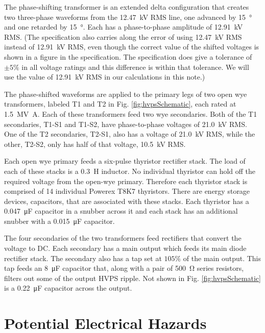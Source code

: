 \documentclass[letterpaper,11pt]{article}
\begin{document}
The phase-shifting transformer is an extended delta configuration that creates two three-phase waveforms from the \SI{12.47}{\kV} RMS line, one advanced by \SI{15}{\degree} and one retarded by \SI{15}{\degree}.  Each has a phase-to-phase amplitude of \SI{12.91}{\kV} RMS.  (The specification also carries along the error of using \SI{12.47}{\kV} RMS instead of \SI{12.91}{\kV} RMS, even though the correct value of the shifted voltages is shown in a figure in the specification.  The specification does give a tolerance of $\pm5\%$ in all voltage ratings and this difference is within that tolerance.  We will use the value of \SI{12.91}{\kV} RMS in our calculations in this note.)

The phase-shifted waveforms are applied to the primary legs of two open wye transformers, labeled T1 and T2 in Fig. \ref{fig:hvpsSchematic}, each rated at \SI{1.5}{\mega\volt\ampere}.  Each of these transformers feed two wye secondaries.  Both of the T1 secondaries, T1-S1 and T1-S2, have phase-to-phase voltages of  \SI{21.0}{\kV} RMS.  One of the T2 secondaries, T2-S1, also has a voltage of \SI{21.0}{\kV} RMS, while the other, T2-S2, only has half of that voltage, \SI{10.5}{\kV} RMS.

Each open wye primary feeds a six-pulse thyristor rectifier stack.  The load of each of these stacks is a \SI{0.3}{\henry} inductor.  No individual thyristor can hold off the required voltage from the open-wye primary.  Therefore each thyristor stack is comprised of 14 individual Powerex T8K7 thyristors. There are energy storage devices, capacitors, that are associated with these stacks.  Each thyristor has a \SI{0.047}{\micro\farad} capacitor in a snubber across it and each stack has an additional snubber with a \SI{0.015}{\micro\farad} capacitor.

The four secondaries of the two transformers feed rectifiers that convert the voltage to DC.  Each secondary has a main output which feeds its main diode rectifier stack.  The secondary also has a tap set at $105\%$ of the main output.  This tap feeds an \SI{8}{\micro\farad} capacitor that, along with a pair of \SI{500}{\ohm} series resistors, filters out some of the output HVPS ripple.\label{S:filterDiscussion}  Not shown in Fig. \ref{fig:hvpsSchematic} is a \SI{0.22}{\micro\farad} capacitor across the output.

\section{Potential Electrical Hazards}
\end{document}
